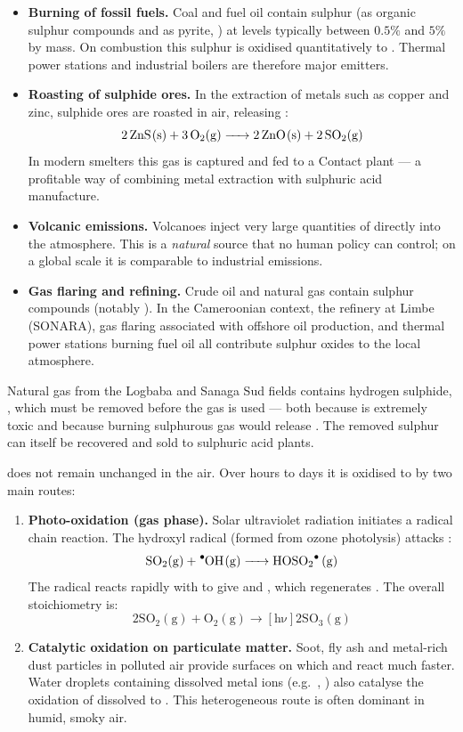 \documentclass[11pt]{article}
\newcounter{popsec}
\newcounter{popsub}
\newcommand{\courssub}[1]{%
  \stepcounter{popsub}%
  \par\vspace{9pt}\noindent{\popxbold\fontsize{11.5}{13}\selectfont\color{popink}{\color{poporange}\thepopsec.\thepopsub}\hspace{6pt}#1}\par\nopagebreak\vspace{4pt}
}
\begin{document}
\begin{itemize}
\item \textbf{Burning of fossil fuels.} Coal and fuel oil contain sulphur (as organic sulphur compounds and as pyrite, ) at levels typically between $0.5\%$ and $5\%$ by mass. On combustion this sulphur is oxidised quantitatively to . Thermal power stations and industrial boilers are therefore major emitters.
\item \textbf{Roasting of sulphide ores.} In the extraction of metals such as copper and zinc, sulphide ores are roasted in air, releasing :
\[ \ce{2ZnS(s) + 3O2(g) -> 2ZnO(s) + 2SO2(g)} \]
In modern smelters this gas is captured and fed to a Contact plant --- a profitable way of combining metal extraction with sulphuric acid manufacture.
\item \textbf{Volcanic emissions.} Volcanoes inject very large quantities of  directly into the atmosphere. This is a \emph{natural} source that no human policy can control; on a global scale it is comparable to industrial emissions.
\item \textbf{Gas flaring and refining.} Crude oil and natural gas contain sulphur compounds (notably ). In the Cameroonian context, the refinery at Limbe (SONARA), gas flaring associated with offshore oil production, and thermal power stations burning fuel oil all contribute sulphur oxides to the local atmosphere.
\end{itemize}

\begin{savaistu}
Natural gas from the Logbaba and Sanaga Sud fields contains hydrogen sulphide, , which must be removed before the gas is used --- both because  is extremely toxic and because burning sulphurous gas would release . The removed sulphur can itself be recovered and sold to sulphuric acid plants.
\end{savaistu}

\courssub{From \ce{SO2} to \ce{SO3}: Atmospheric Oxidation}

 does not remain unchanged in the air. Over hours to days it is oxidised to  by two main routes:

\begin{enumerate}
\item \textbf{Photo-oxidation (gas phase).} Solar ultraviolet radiation initiates a radical chain reaction. The hydroxyl radical  (formed from ozone photolysis) attacks :
\[ \ce{SO2(g) + ^.OH(g) -> HOSO2^. (g)} \]
The  radical reacts rapidly with  to give  and , which regenerates . The overall stoichiometry is:
\[ \ensuremath{\mathrm{2SO_{2}(g) + O_{2}(g) \rightarrow [h\nu] 2SO_{3}(g)}} \]
\item \textbf{Catalytic oxidation on particulate matter.} Soot, fly ash and metal-rich dust particles in polluted air provide surfaces on which  and  react much faster. Water droplets containing dissolved metal ions (e.g.\ , ) also catalyse the oxidation of dissolved  to . This heterogeneous route is often dominant in humid, smoky air.
\end{enumerate}
\end{document}
